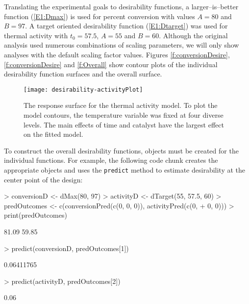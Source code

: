 \documentclass[12pt]{article}
\begin{document}
Translating the experimental goals to desirability functions, a larger--is--better function (\ref{E1:Dmax}) is used for percent conversion with values $A=80$ and $B=97$. A target oriented desirability function (\ref{E1:Dtarget}) was used for thermal activity with $t_0 = 57.5$, $A=55$ and $B=60$. Although the original analysis used numerous combinations of scaling parameters, we will only show analyses with the default scaling factor values. Figures \ref{f:conversionDesire}, \ref{f:conversionDesire} and \ref{f:Overall} show contour plots of the individual desirability function surfaces and the overall surface.


\begin{figure}[p]
   \begin{center}	
  	
\texttt{[image: desirability-activityPlot]}
      \caption{The response surface for the thermal activity model. To plot the model contours, the temperature variable was fixed at four diverse levels. The main effects of time and catalyst have the largest effect on the fitted model.}
      \label{f:activityPred}         
   \end{center}
\end{figure}

To construct the overall desirability functions, objects must be created for the individual functions. For example, the following code chunk creates the appropriate objects and uses the \texttt{predict} method to estimate desirability at the center point of the design:

{\small
\begin{Schunk}
\begin{Sinput}
> conversionD <- dMax(80, 97)
> activityD <- dTarget(55, 57.5, 60)
> predOutcomes <- c(conversionPred(c(0, 0, 0)), activityPred(c(0, 
+     0, 0)))
> print(predOutcomes)
\end{Sinput}
\begin{Soutput}
[1] 81.09 59.85
\end{Soutput}
\begin{Sinput}
> predict(conversionD, predOutcomes[1])
\end{Sinput}
\begin{Soutput}
[1] 0.06411765
\end{Soutput}
\begin{Sinput}
> predict(activityD, predOutcomes[2])
\end{Sinput}
\begin{Soutput}
[1] 0.06
\end{Soutput}
\end{Schunk}
}
\end{document}
